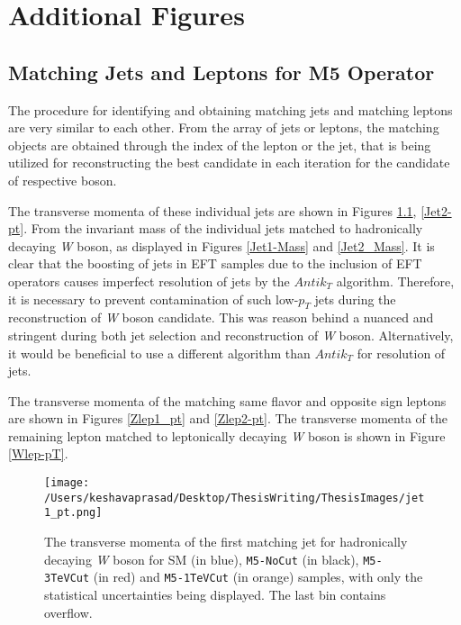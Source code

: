\chapter{Additional Figures}\label{AppendixA}


\section{Matching Jets and Leptons for M5 Operator}
The procedure for identifying and obtaining matching jets and matching leptons are very similar to each other. From the array of jets or leptons, the matching objects are obtained through the index of the lepton or the jet, that is being utilized for reconstructing the best candidate in each iteration for the candidate of respective boson.  

The transverse momenta of these individual jets are shown in Figures \ref{Jet1_pt}, \ref{Jet2-pt}. From the invariant mass of the individual jets matched to hadronically decaying \textit{W} boson, as displayed in Figures \ref{Jet1-Mass} and \ref{Jet2_Mass}. It is clear that the boosting of jets in EFT samples due to the inclusion of EFT operators causes imperfect resolution of jets by the $Antik_{T}$ algorithm. Therefore, it is necessary to prevent contamination of such low-$p_{T}$ jets during the reconstruction of \textit{W} boson candidate. This was reason behind a nuanced and stringent during both jet selection and reconstruction of \textit{W} boson. Alternatively, it would be beneficial to use a different algorithm than $Antik_{T}$ for resolution of jets. 

The transverse momenta of the matching same flavor and opposite sign leptons are shown in Figures \ref{Zlep1_pt} and \ref{Zlep2-pt}. The transverse momenta of the remaining lepton matched to leptonically decaying \textit{W} boson is shown in Figure \ref{Wlep-pT}. 

\begin{figure}[!htb]%
	\centering
	\texttt{[image: /Users/keshavaprasad/Desktop/ThesisWriting/ThesisImages/jet1\_pt.png]}
	\caption{The transverse momenta of the first matching jet for hadronically decaying \textit{W} boson for SM (in blue), \texttt{M5-NoCut} (in black), \texttt{M5-3TeVCut} (in red) and \texttt{M5-1TeVCut} (in orange) samples, with only the statistical uncertainties being displayed. The last bin contains overflow.}
	\label{Jet1_pt}
\end{figure}


